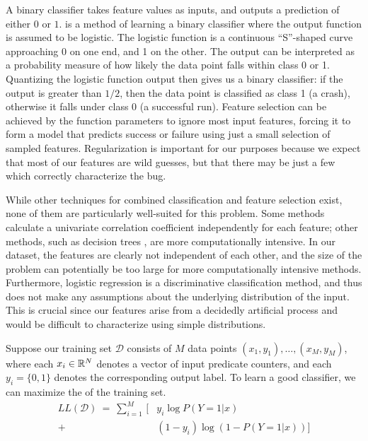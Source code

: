 A binary classifier takes feature values as inputs, and outputs a
prediction of either $0$ or $1$.  
\cite{Hastie01} is a method of learning a binary classifier where the
output function is assumed to be logistic.  The logistic function is a
continuous ``S''-shaped curve approaching 0 on one end, and 1 on the
other.  The output can be interpreted as a probability measure of how
likely the data point falls within class 0 or 1.  Quantizing the
logistic function output then gives us a binary classifier: if the
output is greater than $1/2$, then the data point is classified as
class 1 (a crash), otherwise it falls under class 0 (a successful
run).  Feature selection can be achieved by  the
function parameters to ignore most input features, forcing it to form
a model that predicts success or failure using just a small selection
of sampled features.  Regularization is important for our purposes
because we expect that most of our features are wild guesses, but that
there may be just a few which correctly characterize the bug.

While other techniques for combined classification and feature
selection exist, none of them are particularly well-suited for this
problem.  Some methods \cite{Golub:MCC:1999,Tibshirani2002} calculate
a univariate correlation coefficient independently for each feature;
other methods, such as decision trees \cite{00000048}, are more
computationally intensive.  In our dataset, the features are clearly
not independent of each other, and the size of the problem can
potentially be too large for more computationally intensive methods.
Furthermore, logistic regression is a discriminative classification
method, and thus does not make any assumptions about the underlying
distribution of the input.  This is crucial since our features arise
from a decidedly artificial process and would be difficult to
characterize using simple distributions.

Suppose our training set $\mathcal{D}$ consists of $M$ data points
$(x_1,y_1), \ldots, (x_M, y_M) $, where each $x_i \in \mathbb{R}^N$ denotes
a vector of input predicate counters, and each $y_i = \{0, 1\}$
denotes the corresponding output label.  To learn a good classifier,
we can maximize the  of the training set.
\begin{equation*}
  \begin{split}
    LL(\mathcal{D}) \:=\:
    \sum_{i=1}^M \, [ & y_i \log P(Y = 1 | x) \\
    + & (1 - y_i) \log (1 - P(Y = 1 | x)) ]
  \end{split}
\end{equation*}

